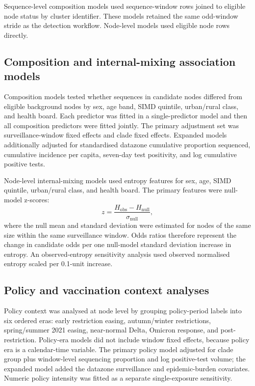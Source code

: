 \documentclass[10pt,letterpaper]{article}
\begin{document}
Sequence-level composition models used sequence-window rows joined to eligible node status by cluster identifier. These models retained the same odd-window stride as the detection workflow. Node-level models used eligible node rows directly.

\subsection*{Composition and internal-mixing association models}

Composition models tested whether sequences in candidate nodes differed from eligible background nodes by sex, age band, SIMD quintile, urban/rural class, and health board. Each predictor was fitted in a single-predictor model and then all composition predictors were fitted jointly. The primary adjustment set was surveillance-window fixed effects and clade fixed effects. Expanded models additionally adjusted for standardised datazone cumulative proportion sequenced, cumulative incidence per capita, seven-day test positivity, and log cumulative positive tests.

Node-level internal-mixing models used entropy features for sex, age, SIMD quintile, urban/rural class, and health board. The primary features were null-model z-scores:
\[
	z = \frac{H_{\mathrm{obs}} - H_{\mathrm{null}}}{\sigma_{\mathrm{null}}},
\]
where the null mean and standard deviation were estimated for nodes of the same size within the same surveillance window. Odds ratios therefore represent the change in candidate odds per one null-model standard deviation increase in entropy. An observed-entropy sensitivity analysis used observed normalised entropy scaled per 0.1-unit increase.

\subsection*{Policy and vaccination context analyses}

Policy context was analysed at node level by grouping policy-period labels into six ordered eras: early restriction easing, autumn/winter restrictions, spring/summer 2021 easing, near-normal Delta, Omicron response, and post-restriction. Policy-era models did not include window fixed effects, because policy era is a calendar-time variable. The primary policy model adjusted for clade group plus window-level sequencing proportion and log positive-test volume; the expanded model added the datazone surveillance and epidemic-burden covariates. Numeric policy intensity was fitted as a separate single-exposure sensitivity.
\end{document}
